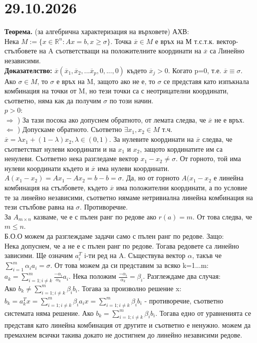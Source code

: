 \documentclass[12pt, a4paper]{article}
\def\D{\mathbb}
\begin{document}
{\centering\section*{29.10.2026}}

\textbf{Теорема.} (за алгебрична характеризация на върховете) АХВ:\\
Нека $M := \{ x\in\D{R}^n:Ax=b,x\geq\sigma\}$. Точка $\overline{x}\in M$ е връх на М т.с.т.к. вектор-стълбовете на A съответстващи на положителните координати на $\overline{x}$ са Линейно независими.\\
\textbf{Доказателство:} $\overline{x}(\overline{x}_1, \overline{x}_2, ... \overline{x}_p, 0, ... ,0)$ където $\overline{x}_j > 0$. Когато p=0, т.е. $\overline{x}\equiv\sigma.$ Ако $\sigma\in M$, то $\sigma$ е връх на M, защото ако не е, то $\sigma$ се представя като изпъкнала комбинация на точки от M, но тези точки са с неотрицателни координати, съответно, няма как да получим $\sigma$ по този начин.\\
$p>0$:\\
$\Rightarrow$ ) За тази посока ако допуснем обратното, от лемата следва, че $\overline{x}$ не е връх.\\
$\Leftarrow$ ) Допускаме обратното. Съответно $\exists x_1, x_2 \in M$ т.ч. $\overline{x} = \lambda x_1 + (1-\lambda)x_2, \lambda\in(0,1)$. За нулевите координати на $\overline{x}$ следва, че съответстват нулеви координати и на $x_1$ и $x_2$, защото кординатите им са ненулеви. Съответно нека разгледаме вектор $x_1-x_2\ne\sigma$. От горното, той има нулеви координати където и $\overline{x}$ има нулеви координати. $A(x_1-x_2)=Ax_1 - Ax_2 = b-b=\sigma$. Да, но от горното $A(x_1-x_2$ е линейна комбинация на стълбовете, където $\overline{x}$ има положителни координати, а по условие те за линейно независими, съответно нямаме нетривиална линейна комбинация на тези стълбове равна на $\sigma$. Противоречие.\\

За $A_{m\times n}$ казваме, че е с пълен ранг по редове ако $r(a) = m$. От това следва, че $m\leq n$.\\
Б.О.О можем да разглеждаме задачи само с пълен ранг по редове. Защо:\\
Нека допуснем, че а не е с пълен ранг по редове. Тогава редовете са линейно зависими. Ще означим $a_i^T$ i-ти ред на A. Съществува вектор $\alpha$, такъв че $\sum_{i=1}^m \alpha_i a_i = \sigma$. От това можем да си представим за всяко k=1...m: $a_k=\sum_{i=1;i\ne k}^m\frac{-\alpha_i}{\alpha_k} a_i$. Нека положим $\frac{-\alpha_i}{\alpha_k} = \beta_i$. Разглеждаме два случая:\\
Ако $b_k\ne\sum_{i=1;i\ne k}^m\beta_i b_i$. Тогава за произволно решение x: $b_k=a_k^Tx=\sum_{i=1;i\ne k}^m\beta_i a_ix=\sum_{i=1;i\ne k}^m\beta_i b_i$ - противоречие, съответно системата няма решение. 
Ако $b_k=\sum_{i=1;i\ne k}^m\beta_i b_i$. Тогава едно от уравненията се представя като линейна комбинация от другите и съответно е ненужно. можем да премахнем всички такива докато не достигнем до линейно независими редове.\\
\end{document}
